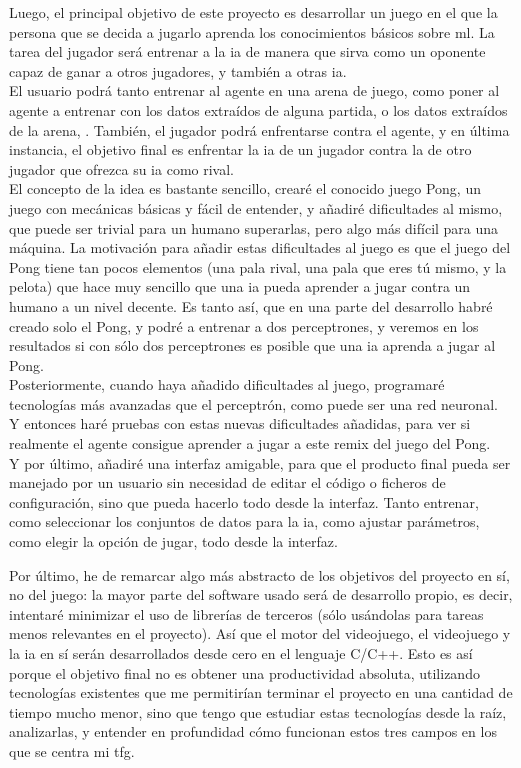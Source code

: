 Luego, el principal objetivo de este proyecto es desarrollar un juego en el que la persona que se decida a jugarlo aprenda los conocimientos básicos sobre \gls{ml}. La tarea del jugador será entrenar a la \gls{ia} de manera que sirva como un oponente capaz de ganar a otros jugadores, y también a otras \gls{ia}.
\\
El usuario podrá tanto entrenar al agente en una arena de juego, como poner al agente a entrenar con los datos extraídos de alguna partida, o los datos extraídos de la arena, . También, el jugador podrá enfrentarse contra el agente, y en última instancia, el objetivo final es enfrentar la \gls{ia} de un jugador contra la de otro jugador que ofrezca su \gls{ia} como rival. 
\\
El concepto de la idea es bastante sencillo, crearé el conocido juego Pong, un juego con mecánicas básicas y fácil de entender, y añadiré dificultades al mismo, que puede ser trivial para un humano superarlas, pero algo más difícil para una máquina. La motivación para añadir estas dificultades al juego es que el juego del Pong tiene tan pocos elementos (una pala rival, una pala que eres tú mismo, y la pelota) que hace muy sencillo que una \gls{ia} pueda aprender a jugar contra un humano a un nivel decente. Es tanto así, que en una parte del  desarrollo habré creado solo el Pong, y podré a entrenar a dos perceptrones, y veremos en los resultados si con sólo dos perceptrones es posible que una \gls{ia} aprenda a jugar al Pong.
\\
Posteriormente, cuando haya añadido dificultades al juego, programaré tecnologías más avanzadas que el perceptrón, como puede ser una red neuronal. Y entonces haré pruebas con estas nuevas dificultades añadidas, para ver si realmente el agente consigue aprender a jugar a este remix del juego del Pong.
\\
Y por último, añadiré una interfaz amigable, para que el producto final pueda ser manejado por un usuario sin necesidad de editar el código o ficheros de configuración, sino que pueda hacerlo todo desde la interfaz. Tanto entrenar, como seleccionar los conjuntos de datos para la \gls{ia}, como ajustar parámetros, como elegir la opción de jugar, todo desde la interfaz.

Por último, he de remarcar algo más abstracto de los objetivos del proyecto en sí, no del juego: la mayor parte del software usado será de desarrollo propio, es decir, intentaré minimizar el uso de librerías de terceros (sólo usándolas para tareas menos relevantes en el proyecto). Así que el motor del videojuego, el videojuego y la \gls{ia} en sí serán desarrollados desde cero en el lenguaje C/C++. Esto es así porque el objetivo final no es obtener una productividad absoluta, utilizando tecnologías existentes que me permitirían terminar el proyecto en una cantidad de tiempo mucho menor, sino que tengo que estudiar estas tecnologías desde la raíz, analizarlas, y entender en profundidad cómo funcionan estos tres campos en los que se centra mi \gls{tfg}.

